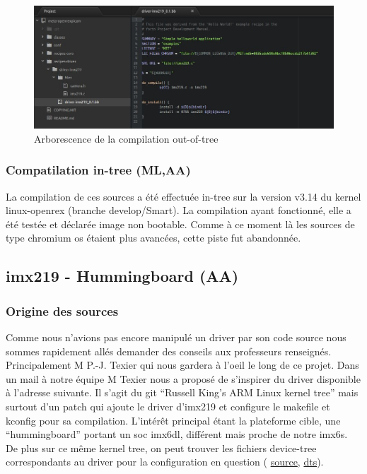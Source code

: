 {\begin{figure}[!htb]
    \centering
    \includegraphics[trim={0cm 0cm 0cm 0cm},clip,scale=0.35]{Figures/outtree.png}
    \decoRule
    \caption{Arborescence de la compilation out-of-tree} \label{fig:outtree}
\end{figure} 

\subsubsection{Compatilation in-tree (ML,AA)}

La compilation de ces sources a été effectuée in-tree sur la version v3.14 du kernel
linux-openrex (branche develop/Smart). La compilation ayant fonctionné, elle a été testée
et déclarée image non bootable. Comme à ce moment là les sources de type chromium os
étaient plus avancées, cette piste fut abandonnée.

\subsection{imx219 - Hummingboard (AA)}

\subsubsection{Origine des sources}

Comme nous n’avions pas encore manipulé un driver par son code source nous sommes
rapidement allés demander des conseils aux professeurs renseignés. Principalement M
P.-J. Texier qui nous gardera à l’oeil le long de ce projet. Dans un mail à notre équipe M
Texier nous a proposé de s’inspirer du driver disponible à l’adresse suivante. Il s’agit du git
“Russell King's ARM Linux kernel tree” mais surtout d’un patch qui ajoute le driver
d’imx219 et configure le makefile et kconfig pour sa compilation. L’intérêt principal étant la
plateforme cible, une “hummingboard” portant un soc imx6dl, différent mais proche de
notre imx6s.
De plus sur ce même kernel tree, on peut trouver les fichiers device-tree correspondants
au driver pour la configuration en question (
\href{http://git.armlinux.org.uk/cgit/linux-arm.git/commit/?h=csi-v6&id=e3f847cd37b007d55b76282414bfcf13abb8fc9a}
{source}, 
\href{http://git.armlinux.org.uk/cgit/linux-arm.git/commit/?h=csi-v6&id=4bd8e1231a2e6eca6a65b565176ea9722611c8dd}
{dts}).

}
